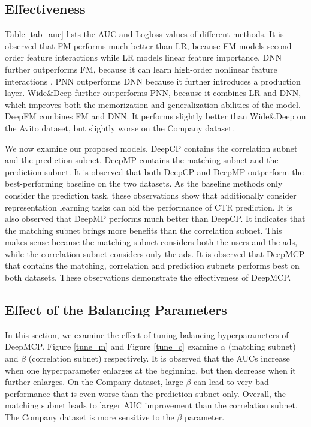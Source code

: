 \documentclass{article}
\begin{document}
\subsection{Effectiveness}
Table \ref{tab_auc} lists the AUC and Logloss values of different methods. It is observed that FM performs much better than LR, because FM models second-order feature interactions while LR models linear feature importance. DNN further outperforms FM, because it can learn high-order nonlinear feature interactions \cite{he2017neural}. PNN outperforms DNN because it further introduces a production layer. Wide\&Deep further outperforms PNN, because it combines LR and DNN, which improves both the memorization and generalization abilities of the model. DeepFM combines FM and DNN. It performs slightly better than Wide\&Deep on the Avito dataset, but slightly worse on the Company dataset.

We now examine our proposed models. DeepCP contains the correlation subnet and the prediction subnet. DeepMP contains the matching subnet and the prediction subnet.
It is observed that both DeepCP and DeepMP outperform the best-performing baseline on the two datasets. As the baseline methods only consider the prediction task, these observations show that additionally consider representation learning tasks can aid the performance of CTR prediction. It is also observed that DeepMP performs much better than DeepCP. It indicates that the matching subnet brings more benefits than the correlation subnet. This makes sense because the matching subnet considers both the users and the ads, while the correlation subnet considers only the ads.
It is observed that DeepMCP that contains the matching, correlation and prediction subnets performs best on both datasets.
These observations demonstrate the effectiveness of DeepMCP.

\subsection{Effect of the Balancing Parameters}
In this section, we examine the effect of tuning balancing hyperparameters of DeepMCP.
Figure \ref{tune_m} and Figure \ref{tune_c} examine $\alpha$ (matching subnet) and $\beta$ (correlation subnet) respectively.
It is observed that the AUCs increase when one hyperparameter enlarges at the beginning, but then decrease when it further enlarges.
On the Company dataset, large $\beta$ can lead to very bad performance that is even worse than the prediction subnet only.
Overall, the matching subnet leads to larger AUC improvement than the correlation subnet.
The Company dataset is more sensitive to the $\beta$ parameter.
\end{document}
